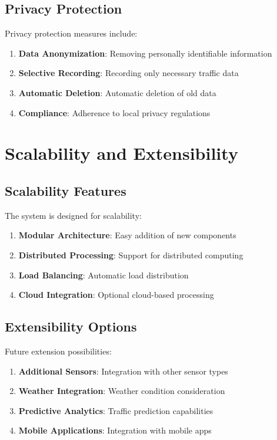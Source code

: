 \subsection{Privacy Protection}

Privacy protection measures include:

\begin{enumerate}
    \item \textbf{Data Anonymization}: Removing personally identifiable information
    \item \textbf{Selective Recording}: Recording only necessary traffic data
    \item \textbf{Automatic Deletion}: Automatic deletion of old data
    \item \textbf{Compliance}: Adherence to local privacy regulations
\end{enumerate}

\section{Scalability and Extensibility}

\subsection{Scalability Features}

The system is designed for scalability:

\begin{enumerate}
    \item \textbf{Modular Architecture}: Easy addition of new components
    \item \textbf{Distributed Processing}: Support for distributed computing
    \item \textbf{Load Balancing}: Automatic load distribution
    \item \textbf{Cloud Integration}: Optional cloud-based processing
\end{enumerate}

\subsection{Extensibility Options}

Future extension possibilities:

\begin{enumerate}
    \item \textbf{Additional Sensors}: Integration with other sensor types
    \item \textbf{Weather Integration}: Weather condition consideration
    \item \textbf{Predictive Analytics}: Traffic prediction capabilities
    \item \textbf{Mobile Applications}: Integration with mobile apps
\end{enumerate}

